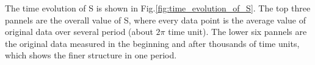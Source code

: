 \documentclass[aps,preprintnumbers,onecolumn,amsmath,amssymb,floatfix,pra]{revtex4-1}
\begin{document}



The time evolution of S is shown in Fig.\ref{fig:time_evolution_of_S}. The top three pannels are the overall value of S, where every data point is the average value of original data over several period (about $2\pi$ time unit). The lower six pannels are the original data measured in the beginning and after thousands of time units, which shows the finer structure in one period. 
\end{document}
